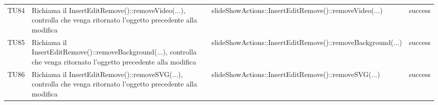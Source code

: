 \begin{longtable} [c]{| p{2cm} | p{6cm} |p{3cm} | p{2cm} |}
		 		 TU84 & Richiama il InsertEditRemove()::removeVideo(...), controlla che venga ritornato l'oggetto precedente alla modifica & slideShowActions::InsertEditRemove()::removeVideo(...) & success \\
		 		 TU85 & Richiama il InsertEditRemove()::removeBackground(...), controlla che venga ritornato l'oggetto precedente alla modifica & slideShowActions::InsertEditRemove()::removeBackground(...) & success \\
		 		 TU86 & Richiama il InsertEditRemove()::removeSVG(...), controlla che venga ritornato l'oggetto precedente alla modifica & slideShowActions::InsertEditRemove()::removeSVG(...) & success \\
		 		 
		  		 \end{longtable}
 				 